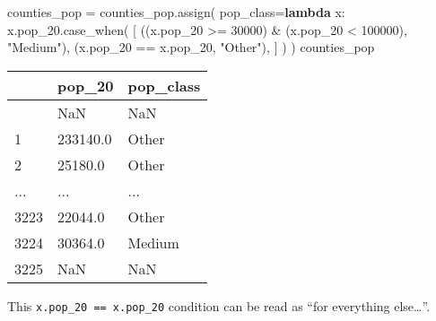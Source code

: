\documentclass[
  letterpaper,
  DIV=11,
  numbers=noendperiod]{scrreprt}
\newenvironment{Shaded}{\begin{snugshade}}{\end{snugshade}}
\newcommand{\DecValTok}[1]{\textcolor[rgb]{0.68,0.00,0.00}{#1}}
\newcommand{\KeywordTok}[1]{\textcolor[rgb]{0.00,0.23,0.31}{\textbf{#1}}}
\newcommand{\NormalTok}[1]{\textcolor[rgb]{0.00,0.23,0.31}{#1}}
\newcommand{\OperatorTok}[1]{\textcolor[rgb]{0.37,0.37,0.37}{#1}}
\newcommand{\StringTok}[1]{\textcolor[rgb]{0.13,0.47,0.30}{#1}}
\begin{document}
\begin{Shaded}
\begin{Highlighting}[]
\NormalTok{counties\_pop }\OperatorTok{=}\NormalTok{ counties\_pop.assign(}
\NormalTok{    pop\_class}\OperatorTok{=}\KeywordTok{lambda}\NormalTok{ x: x.pop\_20.case\_when(}
\NormalTok{        [}
\NormalTok{            ((x.pop\_20 }\OperatorTok{\textgreater{}=} \DecValTok{30000}\NormalTok{) }\OperatorTok{\&}\NormalTok{ (x.pop\_20 }\OperatorTok{\textless{}} \DecValTok{100000}\NormalTok{), }\StringTok{"Medium"}\NormalTok{),}
\NormalTok{            (x.pop\_20 }\OperatorTok{==}\NormalTok{ x.pop\_20, }\StringTok{"Other"}\NormalTok{),}
\NormalTok{        ]}
\NormalTok{    )}
\NormalTok{)}
\NormalTok{counties\_pop}
\end{Highlighting}
\end{Shaded}

\begin{longtable}[]{@{}lll@{}}
\toprule\noalign{}
& pop\_20 & pop\_class \\
\midrule\noalign{}
\endhead
\bottomrule\noalign{}
\endlastfoot
0 & NaN & NaN \\
1 & 233140.0 & Other \\
2 & 25180.0 & Other \\
... & ... & ... \\
3223 & 22044.0 & Other \\
3224 & 30364.0 & Medium \\
3225 & NaN & NaN \\
\end{longtable}

This \texttt{x.pop\_20\ ==\ x.pop\_20} condition can be read as ``for
everything else\ldots{}''.
\end{document}
